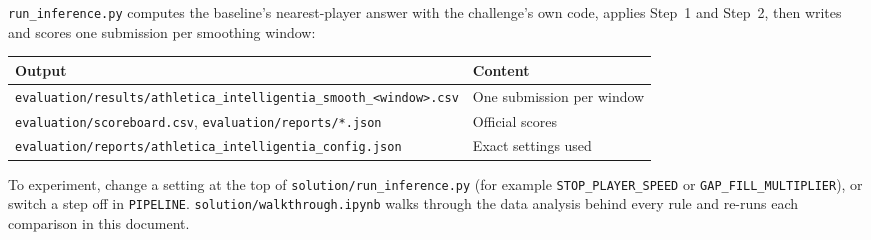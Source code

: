 \documentclass[10pt,a4paper]{article}
\newcommand{\lbl}[1]{\texttt{#1}}
\begin{document}
\lbl{run\_inference.py} computes the baseline's nearest-player answer with the challenge's own code, applies
Step~1 and Step~2, then writes and scores one submission per smoothing window:

\begin{table}[h]
\small
\begin{tabularx}{\linewidth}{@{}>{\footnotesize}p{10.2cm}Y@{}}
\toprule
\normalsize\small\textbf{Output} & \textbf{Content} \\
\midrule
\lbl{evaluation/results/athletica\_intelligentia\_smooth\_<window>.csv} & One submission per window \\
\lbl{evaluation/scoreboard.csv}, \lbl{evaluation/reports/*.json} & Official scores \\
\lbl{evaluation/reports/athletica\_intelligentia\_config.json} & Exact settings used \\
\bottomrule
\end{tabularx}
\end{table}

To experiment, change a setting at the top of \lbl{solution/run\_inference.py} (for example
\lbl{STOP\_PLAYER\_SPEED} or \lbl{GAP\_FILL\_MULTIPLIER}), or switch a step off in \lbl{PIPELINE}.
\lbl{solution/walkthrough.ipynb} walks through the data analysis behind every rule and re-runs each comparison
in this document.
\end{document}

